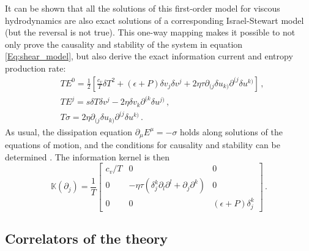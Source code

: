 \documentclass[a4paper, amsfonts, amssymb, amsmath, reprint, showkeys, nofootinbib, twoside,notitlepage,onecolumn]{revtex4-2}
\newcommand{\Ka}{{\mathbb{K}}}
\theoremstyle{definition}
\begin{document}
It can be shown \cite{Gavassino:2024ufs} that all the solutions of this first-order model for viscous hydrodynamics are also exact solutions of a corresponding Israel-Stewart model (but the reversal is not true). This one-way mapping makes it possible to not only prove the causality and stability of the system in equation \,\eqref{Eq:shear_model}, but also derive the exact information current and entropy production rate:
\begin{equation}
\begin{split}
    & T E^0 = \frac{1}{2} \left[ \frac{c_v}{T} \delta T^2 + (\epsilon + P) \delta v_j \delta v^j + 2\eta \tau \partial_{(j} \delta u_{k)} \partial^{(j} \delta u^{k)} \right] \, , \\
    & T E^j = s \delta T \delta v^j - 2\eta \delta v_k \partial^{(k} \delta u^{j)} \, , \\
    & T \sigma = 2 \eta \partial_{(j} \delta u_{k)} \partial^{(j} \delta u^{k)} \, .
\end{split}
\end{equation}
As usual, the dissipation equation $\partial_{\mu} E^{\mu} = -\sigma$ holds along solutions of the equations of motion, and the conditions for causality and stability can be determined \cite{Gavassino:2024ufs}. The information kernel is then 
\begin{equation}
    \Ka (\partial_j) = \dfrac{1}{T} \begin{bmatrix}
        c_v / T & 0 & 0 \\
        0 & -\eta \tau (\delta^k_j \partial_l \partial^l + \partial_j \partial^k) & 0 \\
        0 & 0 & (\epsilon + P) \delta^k_j
    \end{bmatrix} \, .
\end{equation}

\subsection{Correlators of the theory}
\end{document}
